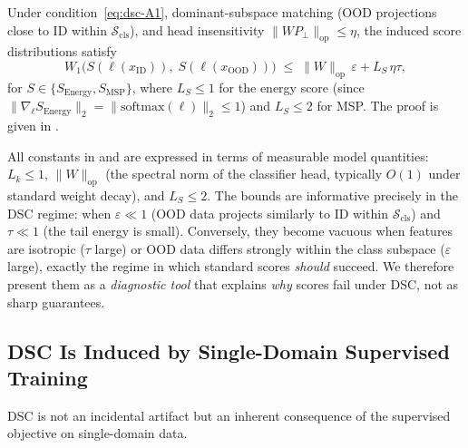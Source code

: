 \begin{proposition}\label{prop:dsc:msp-insens}
Under condition~\eqref{eq:dsc-A1}, dominant-subspace matching (OOD projections close to ID within $\mathcal{S}_{\mathrm{cls}}$), and head insensitivity $\|WP_\perp\|_{\mathrm{op}} \le \eta$, the induced score distributions satisfy
\begin{equation}
  W_1\!\bigl(S(\ell(x_{\mathrm{ID}})),\; S(\ell(x_{\mathrm{OOD}}))\bigr) \;\le\; \|W\|_{\mathrm{op}}\,\varepsilon + L_S\,\eta\tau,
  \label{eq:dsc-logit-fail}
\end{equation}
for $S \in \{S_{\mathrm{Energy}}, S_{\mathrm{MSP}}\}$, where $L_S \le 1$ for the energy score (since $\|\nabla_\ell S_{\mathrm{Energy}}\|_2 = \|\mathrm{softmax}(\ell)\|_2 \le 1$) and $L_S \le 2$ for MSP. The proof is given in .
\end{proposition}

\begin{remark}\label{rem:dsc:tightness}
All constants in  and  are expressed in terms of measurable model quantities: $L_k \le 1$, $\|W\|_{\mathrm{op}}$ (the spectral norm of the classifier head, typically $O(1)$ under standard weight decay), and $L_S \le 2$. The bounds are informative precisely in the DSC regime: when $\varepsilon \ll 1$ (OOD data projects similarly to ID within $\mathcal{S}_{\mathrm{cls}}$) and $\tau \ll 1$ (the tail energy is small). Conversely, they become vacuous when features are isotropic ($\tau$ large) or OOD data differs strongly within the class subspace ($\varepsilon$ large), exactly the regime in which standard scores \emph{should} succeed. We therefore present them as a \emph{diagnostic tool} that explains \emph{why} scores fail under DSC, not as sharp guarantees.
\end{remark}

\subsection{DSC Is Induced by Single-Domain Supervised Training}
\label{subsec:dsc:cause}

DSC is not an incidental artifact but an inherent consequence of the supervised objective on single-domain data.

